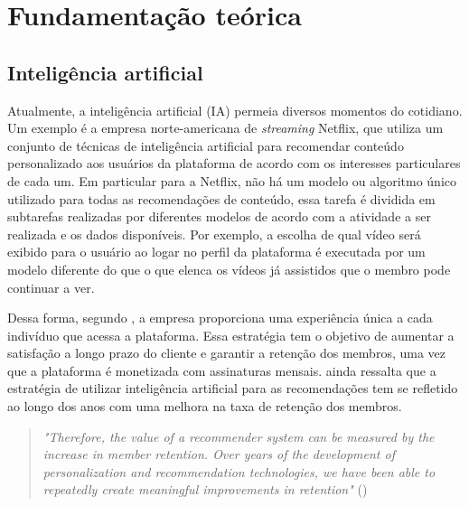 
\chapter{Fundamentação teórica}

\section{Inteligência artificial}

Atualmente, a inteligência artificial (IA) permeia diversos 
momentos do cotidiano. Um exemplo é a empresa norte-americana 
de \textit{streaming} Netflix, que utiliza um conjunto de 
técnicas de inteligência artificial para recomendar conteúdo personalizado aos 
usuários da plataforma de acordo com os interesses 
particulares de cada um. Em particular para a Netflix, 
não há um modelo ou algoritmo único utilizado 
para todas as recomendações de conteúdo, essa tarefa é 
dividida em subtarefas realizadas por diferentes modelos de 
acordo com a atividade a ser realizada e os dados disponíveis. 
Por exemplo, a escolha de qual vídeo será exibido para 
o usuário ao logar no perfil da plataforma é executada por um 
modelo  diferente do que o que elenca os vídeos já assistidos que o 
membro pode continuar a ver.

Dessa forma, segundo \cite{netflix}, a empresa proporciona uma 
experiência única a cada indivíduo que acessa a plataforma. Essa 
estratégia tem o objetivo de aumentar a satisfação a longo prazo 
do cliente e garantir a retenção dos membros, uma vez 
que a plataforma é monetizada com assinaturas mensais. \cite{netflix}
ainda ressalta que a estratégia de utilizar inteligência 
artificial para as recomendações tem se refletido ao longo 
dos anos com uma melhora na taxa de retenção dos membros.

\begin{quote}
  \textit{"Therefore, the value of a recommender system can be measured by
the increase in member retention. Over years of the development of personalization and recommendation technologies, we have been able to repeatedly create meaningful
improvements in retention"} (\cite{netflix})
\end{quote}

